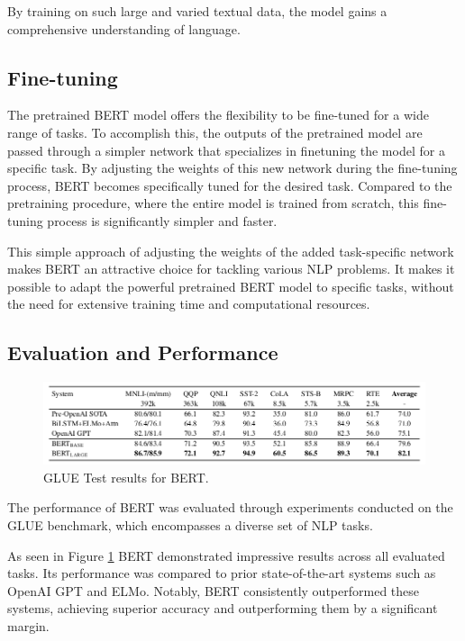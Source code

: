 \documentclass[12pt,oneside,bibtotoc,liststotoc]{scrbook}
\begin{document}
By training on such large and varied textual data, the model gains a comprehensive understanding of language. \cite{bert}

\subsection{Fine-tuning}
The pretrained BERT model offers the flexibility to be fine-tuned for a wide range of tasks. To accomplish this, the outputs of the pretrained model are passed through a simpler network that specializes in finetuning the model for a specific task. By adjusting the weights of this new network during the fine-tuning process, BERT becomes specifically tuned for the desired task. Compared to the pretraining procedure, where the entire model is trained from scratch, this fine-tuning process is significantly simpler and faster.

This simple approach of adjusting the weights of the added task-specific network makes BERT an attractive choice for tackling various NLP problems. It makes it possible to adapt the powerful pretrained BERT model to specific tasks, without the need for extensive training time and computational resources. \cite{bert}


\subsection{Evaluation and Performance}
\begin{figure}
  \centering
  \includegraphics[width=12cm]{img/bert_results.png}
  \caption{GLUE Test results for BERT. \cite{bert}}
  \label{fig:bert_results}
\end{figure}

The performance of BERT was evaluated through experiments conducted on the GLUE benchmark, which encompasses a diverse set of NLP tasks.

As seen in Figure \ref{fig:bert_results} BERT demonstrated impressive results across all evaluated tasks. Its performance was compared to prior state-of-the-art systems such as OpenAI GPT and ELMo. Notably, BERT consistently outperformed these systems, achieving superior accuracy and outperforming them by a significant margin.
\end{document}
